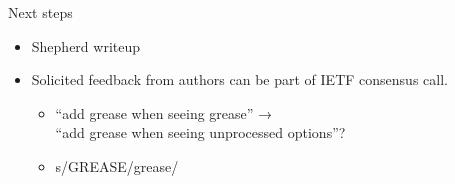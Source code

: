 \begin{frame}{Next steps}\Large
  \begin{itemize}
    \item Shepherd writeup
    \bigskip
    \item Solicited feedback from  authors can be part of IETF consensus call.
      \begin{itemize}
        \item \Large ``add grease when seeing grease'' → \\ ``add grease when seeing unprocessed options''?
        \item s/GREASE/grease/
      \end{itemize}
  \end{itemize}
\end{frame}


